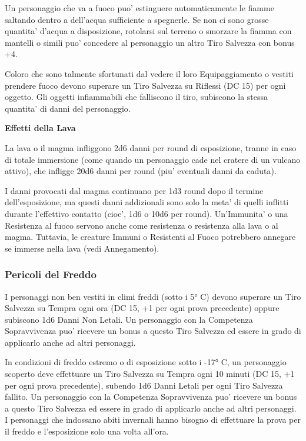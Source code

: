 \documentclass[a4paper,11pt,twoside,openany]{book}
\begin{document}
{Un personaggio che va a fuoco puo' estinguere automaticamente le fiamme saltando dentro a dell'acqua sufficiente a spegnerle. Se non ci sono grosse quantita' d'acqua a disposizione, rotolarsi sul terreno o smorzare la fiamma con mantelli o simili puo' concedere al personaggio un altro Tiro Salvezza con bonus +4.

Coloro che sono talmente sfortunati dal vedere il loro Equipaggiamento o vestiti prendere fuoco devono superare un Tiro Salvezza su Riflessi (DC 15) per ogni oggetto. Gli oggetti infiammabili che falliscono il tiro, subiscono la stessa quantita' di danni del personaggio.

\medskip

\textbf{Effetti della Lava}

La lava o il magma infliggono 2d6 danni per round di esposizione, tranne in caso di totale immersione (come quando un personaggio cade nel cratere di un vulcano attivo), che infligge 20d6 danni per round (piu' eventuali danni da caduta).

I danni provocati dal magma continuano per 1d3 round dopo il termine dell'esposizione, ma questi danni addizionali sono solo la meta' di quelli inflitti durante l'effettivo contatto (cioe', 1d6 o 10d6 per round). Un'Immunita' o una Resistenza al fuoco servono anche come resistenza o resistenza alla lava o al magma. Tuttavia, le creature Immuni o Resistenti al Fuoco potrebbero annegare se immerse nella lava (vedi Annegamento).


\subsubsection{Pericoli del Freddo}

\label{pericoli-del-freddo}

I personaggi non ben vestiti in climi freddi (sotto i 5° C) devono superare un Tiro Salvezza su Tempra ogni ora (DC 15, +1 per ogni prova precedente) oppure subiscono 1d6 Danni Non Letali. Un personaggio con la Competenza Sopravvivenza puo' ricevere un bonus a questo Tiro Salvezza ed essere in grado di applicarlo anche ad altri personaggi.

In condizioni di freddo estremo o di esposizione sotto i -17° C, un personaggio scoperto deve effettuare un Tiro Salvezza su Tempra ogni 10 minuti (DC 15, +1 per ogni prova precedente), subendo 1d6 Danni Letali per ogni Tiro Salvezza fallito. Un personaggio con la Competenza Sopravvivenza puo' ricevere un bonus a questo Tiro Salvezza ed essere in grado di applicarlo anche ad altri personaggi. I personaggi che indossano abiti invernali hanno bisogno di effettuare la prova per il freddo e l'esposizione solo una volta all'ora.

}
\end{document}
